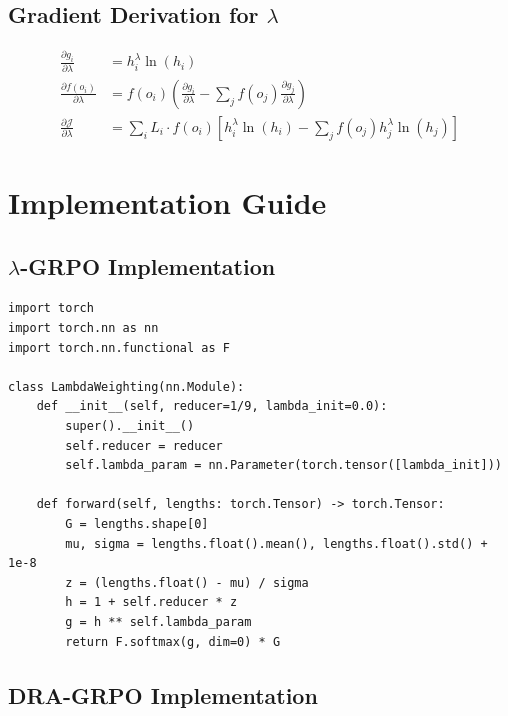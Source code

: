 \documentclass[11pt,a4paper]{article}
\begin{document}
\subsection{Gradient Derivation for $\lambda$}

\begin{align}
\frac{\partial g_i}{\partial \lambda} &= h_i^\lambda \ln(h_i) \\
\frac{\partial f(o_i)}{\partial \lambda} &= f(o_i) \left( \frac{\partial g_i}{\partial \lambda} - \sum_j f(o_j) \frac{\partial g_j}{\partial \lambda} \right) \\
\frac{\partial \mathcal{J}}{\partial \lambda} &= \sum_i L_i \cdot f(o_i) \left[ h_i^\lambda \ln(h_i) - \sum_j f(o_j) h_j^\lambda \ln(h_j) \right]
\end{align}

\newpage


\section{Implementation Guide}

\subsection{$\lambda$-GRPO Implementation}

\begin{lstlisting}
import torch
import torch.nn as nn
import torch.nn.functional as F

class LambdaWeighting(nn.Module):
    def __init__(self, reducer=1/9, lambda_init=0.0):
        super().__init__()
        self.reducer = reducer
        self.lambda_param = nn.Parameter(torch.tensor([lambda_init]))
    
    def forward(self, lengths: torch.Tensor) -> torch.Tensor:
        G = lengths.shape[0]
        mu, sigma = lengths.float().mean(), lengths.float().std() + 1e-8
        z = (lengths.float() - mu) / sigma
        h = 1 + self.reducer * z
        g = h ** self.lambda_param
        return F.softmax(g, dim=0) * G
\end{lstlisting}

\subsection{DRA-GRPO Implementation}
\end{document}
